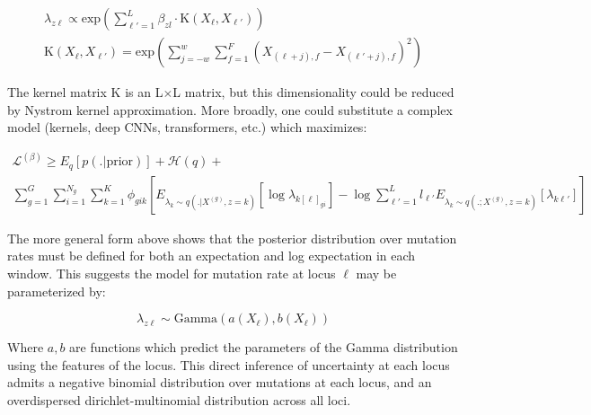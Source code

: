 \documentclass{article}
\newcommand{\Lagr}{\mathcal{L}}
\begin{document}
\begin{equation}
\begin{split}
\lambda_{z\ell} \propto \textrm{exp} \left( \sum_{\ell'=1}^L \beta_{zl} \cdot \mathrm{K}(X_\ell, X_{\ell'}) \right) \\
	\mathrm{K}(X_\ell, X_{\ell'}) = \textrm{exp}\left(  \sum_{j=-w}^w \sum_{f=1}^F \left(X_{(\ell + j),f} - X_{(\ell'+j),f} \right)^2 \right)
\end{split}
\end{equation} 

The kernel matrix $\mathrm{K}$ is an L$\times$L matrix, but this dimensionality could be reduced by Nystrom kernel approximation. More broadly, one could substitute a complex model (kernels, deep CNNs, transformers, etc.) which maximizes:

\begin{equation}
\begin{split}
\Lagr^{(\beta)} \geq E_q [ p(. | \textrm{prior}) ] + \mathcal{H}(q) + \\
	\sum_{g=1}^G \sum_{i=1}^{N_g} \sum_{k=1}^K  \phi_{gik} \left[ E_{\lambda_k \sim q(.|X^{(g)}, z=k)} [ \log \lambda_{k[\ell]_{gi}}] - \log{\sum_{\ell'=1}^L l_{\ell'}  E_{\lambda_k \sim q(.;X^{(g)}, z=k)}[\lambda_{k\ell'}]} \right]
\end{split}
\end{equation}

The more general form above shows that the posterior distribution over mutation rates must be defined for both an expectation and log expectation in each window. This suggests the model for mutation rate at locus $\ell$ may be parameterized by:

\begin{equation}
\lambda_{z\ell} \sim \mathrm{Gamma}(a(X_\ell), b(X_\ell))
\end{equation}

Where $a, b$ are functions which predict the parameters of the Gamma distribution using the features of the locus. This direct inference of uncertainty at each locus admits a negative binomial distribution over mutations at each locus, and an overdispersed dirichlet-multinomial distribution across all loci.
\end{document}
